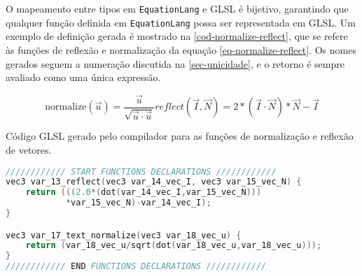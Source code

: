 O mapeamento entre tipos em \texttt{EquationLang} e GLSL é bijetivo, garantindo que qualquer função definida em \texttt{EquationLang} possa ser representada em GLSL. Um exemplo de definição gerada é mostrado na \autoref{cod-normalize-reflect}, que se refere às funções de reflexão e normalização da equação \autoref{eq-normalize-reflect}. Os nomes gerados seguem a numeração discutida na \autoref{sec-unicidade}, e o retorno é sempre avaliado como uma única expressão.


\label{eq-normalize-reflect} \begin{subequations}
\begin{equation}
  \text{normalize}(\vec{u}) = \frac{\vec{u}}{\sqrt{\vec{u} \cdot \vec{u}}}
\end{equation}

\begin{equation}
reflect(\vec I, \vec N) =  2*(\vec I \cdot \vec N)*\vec N - \vec I
\end{equation}
\end{subequations}

\begin{codigo}[H]
   \caption{\small Código GLSL gerado pelo compilador para as funções de normalização e reflexão de vetores. }
   \label{cod-normalize-reflect}
\begin{lstlisting}[language=C, inputencoding=utf8]
//////////// START FUNCTIONS DECLARATIONS ////////////
vec3 var_13_reflect(vec3 var_14_vec_I, vec3 var_15_vec_N) {
    return (((2.0*(dot(var_14_vec_I,var_15_vec_N)))
            *var_15_vec_N)-var_14_vec_I);
}

vec3 var_17_text_normalize(vec3 var_18_vec_u) {
    return (var_18_vec_u/sqrt(dot(var_18_vec_u,var_18_vec_u)));
}
//////////// END FUNCTIONS DECLARATIONS ////////////

\end{lstlisting}
\end{codigo}
